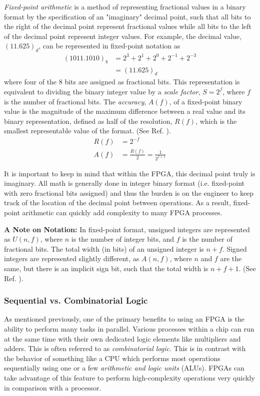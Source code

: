 \documentclass[reprint,amsmath,amssymb]{revtex4-2}
\begin{document}
\textit{Fixed-point arithmetic} is a method of representing fractional values in a binary format by the specification of an "imaginary" decimal point, such that all bits to the right of the decimal point represent fractional values while all bits to the left of the decimal point represent integer values. For example, the decimal value, $(11.625)_d$, can be represented in fixed-point notation as 
\begin{align*}
    (1011.1010)_b & = 2^3 + 2^1 + 2^0 + 2^{-1} + 2^{-3} \\
    & = (11.625)_d
\end{align*}
where four of the 8 bits are assigned as fractional bits. This representation is equivalent to dividing the binary integer value by a \textit{scale factor}, $S = 2^f$, where $f$ is the number of fractional bits. The \textit{accuracy}, $A(f)$, of a  fixed-point binary value is the magnitude of the maximum difference between a real value and its binary representation, defined as half of the resolution, $R(f)$, which is the smallest representable value of the format. (See Ref. \cite{fixed-point}).
\begin{align}
    R(f) & = 2^{-f} \\
    A(f) & = \frac{R(f)}{2} = \frac{1}{2^{f+1}}
\end{align}

It is important to keep in mind that within the FPGA, this decimal point truly is imaginary. All math is generally done in integer binary format (i.e. fixed-point with zero fractional bits assigned) and thus the burden is on the engineer to keep track of the location of the decimal point between operations. As a result, fixed-point arithmetic can quickly add complexity to many FPGA processes.

\textbf{A Note on Notation:} In fixed-point format, unsigned integers are represented as $U(n,f)$, where $n$ is the number of integer bits, and $f$ is the number of fractional bits. The total width (in bits) of an unsigned integer is $n+f$. Signed integers are represented slightly different, as $A(n,f)$, where $n$ and $f$ are the same, but there is an implicit sign bit, such that the total width is $n+f+1$. (See Ref. \cite{fixed-point}).

\subsubsection{Sequential vs. Combinatorial Logic}
As mentioned previously, one of the primary benefits to using an FPGA is the ability to perform many tasks in parallel. Various processes within a chip can run at the same time with their own dedicated logic elements like multipliers and adders. This is often referred to as \textit{combinatorial logic}. This is in contrast with the behavior of something like a CPU which performs most operations sequentially using one or a few \textit{arithmetic and logic units} (ALUs). FPGAs can take advantage of this feature to perform high-complexity operations very quickly in comparison with a processor. 
\end{document}
